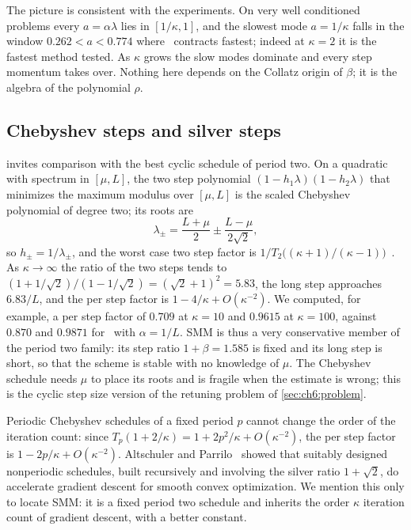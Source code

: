 The picture is consistent with the experiments.
On very well conditioned problems every $a=\alpha\lambda$ lies in $[1/\kappa,1]$, and the slowest mode $a=1/\kappa$ falls in the window $0.262<a<0.774$ where \smmdet\ contracts fastest; indeed at $\kappa=2$ it is the fastest method tested.
As $\kappa$ grows the slow
modes dominate and every step momentum takes over. Nothing here depends on the
Collatz origin of $\beta$; it is the algebra of the polynomial
$\rho$.

\subsection{Chebyshev steps and silver steps}

 invites comparison with the best cyclic schedule of period
two. On a quadratic with spectrum in $[\mu,L]$, the two step polynomial
$(1-h_1\lambda)(1-h_2\lambda)$ that minimizes the maximum modulus over
$[\mu,L]$ is the scaled Chebyshev polynomial of degree two; its roots are
\[
  \lambda_\pm=\frac{L+\mu}2\pm\frac{L-\mu}{2\sqrt2},
\]
so $h_\pm=1/\lambda_\pm$, and the worst case two step factor is
$1/T_2\bigl((\kappa+1)/(\kappa-1)\bigr)$~\cite{young1953,golub1961}. As
$\kappa\to\infty$ the ratio of the two steps tends to
$(1+1/\sqrt2)/(1-1/\sqrt2)=(\sqrt2+1)^2=5.83$, the long step approaches
$6.83/L$, and the per step factor is $1-4/\kappa+O(\kappa^{-2})$. We computed,
for example, a per step factor of $0.709$ at $\kappa=10$ and $0.9615$ at
$\kappa=100$, against $0.870$ and $0.9871$ for \smmdet\ with $\alpha=1/L$. SMM is
thus a very conservative member of the period two family: its step ratio
$1+\beta=1.585$ is fixed and its long step is short, so that the scheme is
stable with no knowledge of $\mu$. The Chebyshev schedule needs $\mu$ to place
its roots and is fragile when the estimate is wrong; this is the cyclic step
size version of the retuning problem of \cref{sec:ch6:problem}.

Periodic Chebyshev schedules of a fixed period $p$ cannot change the order of
the iteration count: since $T_p(1+2/\kappa)=1+2p^2/\kappa+O(\kappa^{-2})$, the per
step factor is $1-2p/\kappa+O(\kappa^{-2})$. Altschuler and
Parrilo~\cite{altschuler2024} showed that suitably designed nonperiodic
schedules, built recursively and involving the silver ratio $1+\sqrt2$, do
accelerate gradient descent for smooth convex optimization. We mention this only to locate SMM: it is a fixed period two
schedule and inherits the order $\kappa$ iteration count of gradient descent,
with a better constant.

